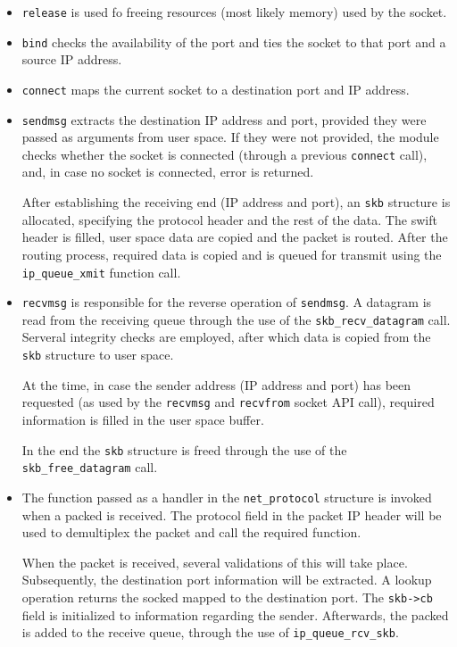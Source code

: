 \begin{itemize}
  \item \texttt{release} is used fo freeing resources (most likely memory)
  used by the socket.
  \item \texttt{bind} checks the availability of the port and ties the socket
  to that port and a source IP address.
  \item \texttt{connect} maps the current socket to a destination port and IP
  address.
  \item \texttt{sendmsg} extracts the destination IP address and port,
  provided they were passed as arguments from user space. If they were not
  provided, the module checks whether the socket is connected (through a
  previous \texttt{connect} call), and, in case no socket is connected, error
  is returned.

  After establishing the receiving end (IP address and port), an
  \texttt{skb} structure is allocated, specifying the protocol header and the
  rest of the data. The swift header is filled, user space data are copied and
  the packet is routed. After the routing process, required data is copied and
  is queued for transmit using the \texttt{ip\_queue\_xmit} function call.

  \item \texttt{recvmsg} is responsible for the reverse operation of
  \texttt{sendmsg}. A datagram is read from the receiving queue through the
  use of the \texttt{skb\_recv\_datagram} call. Serveral integrity checks are
  employed, after which data is copied from the \texttt{skb} structure to user
  space.

  At the time, in case the sender address (IP address and port) has been
  requested (as used by the \texttt{recvmsg} and \texttt{recvfrom} socket API
  call), required information is filled in the user space buffer.

  In the end the \texttt{skb} structure is freed through the use of the
  \texttt{skb\_free\_datagram} call.

  \item The function passed as a handler in the \texttt{net\_protocol}
  structure is invoked when a packed is received. The protocol field in the
  packet IP header will be used to demultiplex the packet and call the
  required function.

  When the packet is received, several validations of this will take place.
  Subsequently, the destination port information will be extracted. A lookup
  operation returns the socked mapped to the destination port. The
  \texttt{skb->cb} field is initialized to information regarding the sender.
  Afterwards, the packed is added to the receive queue, through the use of
  \texttt{ip\_queue\_rcv\_skb}.
\end{itemize}

